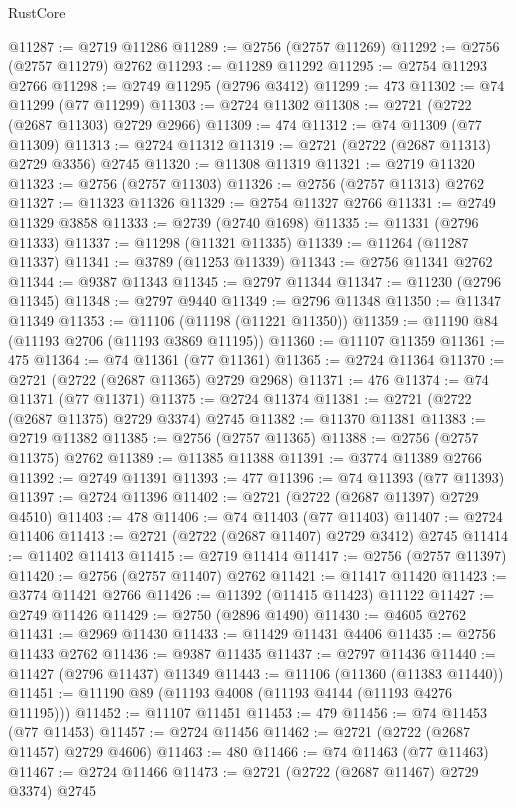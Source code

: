 \begin{lexlean}{RustCore}
\begin{coremodule}
@11287 := @2719 @11286
@11289 := @2756 (@2757 @11269)
@11292 := @2756 (@2757 @11279) @2762
@11293 := @11289 @11292
@11295 := @2754 @11293 @2766
@11298 := @2749 @11295 (@2796 @3412)
@11299 := 473
@11302 := @74 @11299 (@77 @11299)
@11303 := @2724 @11302
@11308 := @2721 (@2722 (@2687 @11303) @2729 @2966)
@11309 := 474
@11312 := @74 @11309 (@77 @11309)
@11313 := @2724 @11312
@11319 := @2721 (@2722 (@2687 @11313) @2729 @3356) @2745
@11320 := @11308 @11319
@11321 := @2719 @11320
@11323 := @2756 (@2757 @11303)
@11326 := @2756 (@2757 @11313) @2762
@11327 := @11323 @11326
@11329 := @2754 @11327 @2766
@11331 := @2749 @11329 @3858
@11333 := @2739 (@2740 @1698)
@11335 := @11331 (@2796 @11333)
@11337 := @11298 (@11321 @11335)
@11339 := @11264 (@11287 @11337)
@11341 := @3789 (@11253 @11339)
@11343 := @2756 @11341 @2762
@11344 := @9387 @11343
@11345 := @2797 @11344
@11347 := @11230 (@2796 @11345)
@11348 := @2797 @9440
@11349 := @2796 @11348
@11350 := @11347 @11349
@11353 := @11106 (@11198 (@11221 @11350))
@11359 := @11190 @84 (@11193 @2706 (@11193 @3869 @11195))
@11360 := @11107 @11359
@11361 := 475
@11364 := @74 @11361 (@77 @11361)
@11365 := @2724 @11364
@11370 := @2721 (@2722 (@2687 @11365) @2729 @2968)
@11371 := 476
@11374 := @74 @11371 (@77 @11371)
@11375 := @2724 @11374
@11381 := @2721 (@2722 (@2687 @11375) @2729 @3374) @2745
@11382 := @11370 @11381
@11383 := @2719 @11382
@11385 := @2756 (@2757 @11365)
@11388 := @2756 (@2757 @11375) @2762
@11389 := @11385 @11388
@11391 := @3774 @11389 @2766
@11392 := @2749 @11391
@11393 := 477
@11396 := @74 @11393 (@77 @11393)
@11397 := @2724 @11396
@11402 := @2721 (@2722 (@2687 @11397) @2729 @4510)
@11403 := 478
@11406 := @74 @11403 (@77 @11403)
@11407 := @2724 @11406
@11413 := @2721 (@2722 (@2687 @11407) @2729 @3412) @2745
@11414 := @11402 @11413
@11415 := @2719 @11414
@11417 := @2756 (@2757 @11397)
@11420 := @2756 (@2757 @11407) @2762
@11421 := @11417 @11420
@11423 := @3774 @11421 @2766
@11426 := @11392 (@11415 @11423) @11122
@11427 := @2749 @11426
@11429 := @2750 (@2896 @1490)
@11430 := @4605 @2762
@11431 := @2969 @11430
@11433 := @11429 @11431 @4406
@11435 := @2756 @11433 @2762
@11436 := @9387 @11435
@11437 := @2797 @11436
@11440 := @11427 (@2796 @11437) @11349
@11443 := @11106 (@11360 (@11383 @11440))
@11451 := @11190 @89 (@11193 @4008 (@11193 @4144 (@11193 @4276 @11195)))
@11452 := @11107 @11451
@11453 := 479
@11456 := @74 @11453 (@77 @11453)
@11457 := @2724 @11456
@11462 := @2721 (@2722 (@2687 @11457) @2729 @4606)
@11463 := 480
@11466 := @74 @11463 (@77 @11463)
@11467 := @2724 @11466
@11473 := @2721 (@2722 (@2687 @11467) @2729 @3374) @2745

\end{coremodule}
\end{lexlean}
